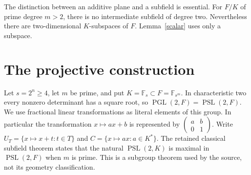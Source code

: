 \documentclass[11pt]{article}
\newcommand{\F}{\mathbb F}
\newcommand{\PG}{\operatorname{PGL}}
\newcommand{\PS}{\operatorname{PSL}}
\begin{document}
The distinction between an additive plane and a subfield is essential.
For $F/K$ of prime degree $m>2$, there is no intermediate subfield of
degree two. Nevertheless there are two-dimensional $K$-subspaces of $F$.
Lemma~\ref{scalar} uses only a subspace.

\section{The projective construction}
Let $s=2^n\geq4$, let $m$ be prime, and put $K=\F_s\subset F=\F_{s^m}$.
In characteristic two every nonzero determinant has a square root, so
$\PG(2,F)=\PS(2,F)$. We use fractional linear transformations as literal
elements of this group. In particular the transformation $x\mapsto ax+b$
is represented by $\left(\begin{smallmatrix}a&b\\0&1\end{smallmatrix}\right)$.
Write $U_T=\{x\mapsto x+t:t\in T\}$ and
$C=\{x\mapsto ax:a\in K^*\}$. The retained classical subfield theorem
states that the natural $\PS(2,K)$ is maximal in $\PS(2,F)$ when $m$
is prime. This is a subgroup theorem used by the source, not its geometry
classification.
\end{document}
